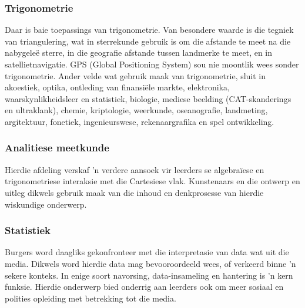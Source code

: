 \subsubsection{Trigonometrie}
Daar is baie toepassings van trigonometrie. Van besondere waarde is die tegniek van triangulering, wat in sterrekunde gebruik is om die afstande te meet na die nabygele\"{e} sterre, in die geografie afstande tussen landmerke te meet, en in satellietnavigatie. GPS (Global Positioning System) sou nie moontlik wees sonder trigonometrie. Ander velde wat gebruik maak van trigonometrie, sluit in akoestiek,
optika, ontleding van finansi\"{e}le markte, elektronika, waarskynlikheidsleer en statistiek, biologie, mediese beelding (CAT-skanderings en ultraklank), chemie, kriptologie, weerkunde, oseanografie, landmeting, argitektuur, fonetiek, ingenieurswese, rekenaargrafika en spel ontwikkeling.

\subsubsection{Analitiese meetkunde}
Hierdie afdeling verskaf 'n verdere aansoek vir leerders se algebra\"{i}ese en trigonometriese interaksie met die Cartesiese vlak. Kunstenaars en die ontwerp en uitleg dikwels gebruik maak van die inhoud en denkprosesse van hierdie wiskundige onderwerp.

\subsubsection{Statistiek}
Burgers word daagliks gekonfronteer met die interpretasie van data wat uit die media. Dikwels word hierdie data mag bevooroordeeld wees, of verkeerd binne 'n sekere konteks. In enige soort navorsing, data-insameling en hantering is 'n kern funksie. Hierdie onderwerp bied onderrig aan leerders ook om meer sosiaal en polities opleiding met betrekking tot die media.

